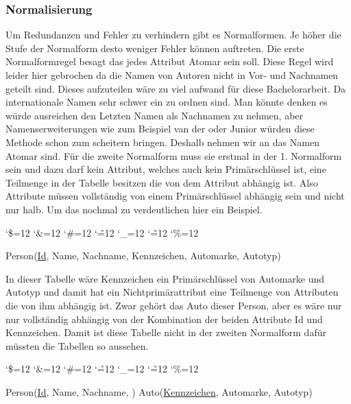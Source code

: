 \documentclass[a4paper,12pt]{article}
\newenvironment{simplechar}{%
	\catcode`\$=12
	\catcode`\&=12
	\catcode`\#=12
	\catcode`\^=12
	\catcode`\_=12
	\catcode`\~=12
	\catcode`\%=12
}{}
\begin{document}
	\subsubsection{Normalisierung}
	
	Um Redundanzen und Fehler zu verhindern gibt es Normalformen. Je höher die Stufe der Normalform desto weniger Fehler können auftreten. Die erste Normalformregel besagt das jedes Attribut Atomar sein soll. Diese Regel wird leider hier gebrochen da die Namen von Autoren nicht in Vor- und Nachnamen geteilt sind. Dieses aufzuteilen wäre zu viel aufwand für diese Bachelorarbeit. Da internationale Namen sehr schwer ein zu ordnen sind. Man könnte denken es würde ausreichen den Letzten Namen als Nachnamen zu nehmen, aber Namenserweiterungen wie zum Beispiel van der oder Junior würden diese Methode schon zum scheitern bringen. Deshalb nehmen wir an das Namen Atomar sind.
	Für die zweite Normalform muss sie erstmal in der 1. Normalform sein und dazu darf kein Attribut, welches auch kein Primärschlüssel ist, eine Teilmenge in der Tabelle besitzen die von dem Attribut abhängig ist. Also Attribute müssen vollständig von einem Primärschlüssel abhängig sein und nicht nur halb.  Um das nochmal zu verdeutlichen hier ein Beispiel.
	
	\begin{simplechar}
		\begin{flushleft}
			\begin{small}
				Person(\uline{Id}, Name, Nachname, Kennzeichen, Automarke, Autotyp)
			\end{small}
		\end{flushleft}
	\end{simplechar}
	
	In dieser Tabelle wäre Kennzeichen ein Primärschlüssel von Automarke und Autotyp und damit hat ein Nichtprimärattribut eine Teilmenge von Attributen die von ihm abhängig ist. Zwar gehört das Auto dieser Person, aber es wäre nur nur vollständig abhängig von der Kombination der beiden Attribute Id und Kennzeichen. Damit ist diese Tabelle nicht in der zweiten Normalform dafür müssten die Tabellen so aussehen.
	
	\begin{simplechar}
		\begin{flushleft}
			\begin{small}
				Person(\uline{Id}, Name, Nachname, \dotuline{Kennzeichen})\newline
				Auto(\uline{Kennzeichen}, Automarke, Autotyp)
			\end{small}
		\end{flushleft}
	\end{simplechar}
	
\end{document}
